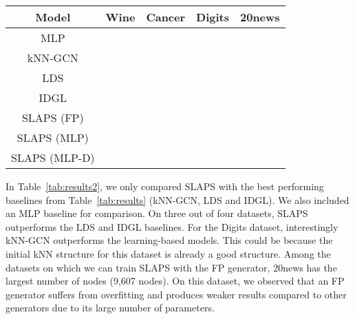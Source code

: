 \documentclass{article}
\begin{document}
\begin{table*}[t]
\scriptsize
\caption{Results on classification datasets.  indicates results have been taken from \citet{franceschi2019learning}. Bold and underlined values indicate best and second-best mean performances respectively.}
\label{tab:results2}
\begin{center}
\begin{tabular}{c|cccc}
 Model & Wine & Cancer & Digits & 20news \\ \hline
MLP &  &  &  &  \\
kNN-GCN &  &  &  &  \\
LDS &  &  &  &  \\
IDGL &  &  &  &  \\
\hline
SLAPS (FP) &  & &  &  \\
SLAPS (MLP) & & &  &  \\
SLAPS (MLP-D) & & &  & 
\end{tabular}
\end{center}
\end{table*}

In Table~\ref{tab:results2}, we only compared SLAPS with the best performing baselines from Table~\ref{tab:results} (kNN-GCN, LDS and IDGL). We also included an MLP baseline for comparison. On three out of four datasets, SLAPS outperforms the LDS and IDGL baselines. For the Digits dataset, interestingly kNN-GCN outperforms the learning-based models. This could be because the initial kNN structure for this dataset is already a good structure. Among the datasets on which we can train SLAPS with the FP generator, 20news has the largest number of nodes (9,607 nodes). On this dataset, we observed that an FP generator suffers from overfitting and produces weaker results compared to other generators due to its large number of parameters.
\end{document}
